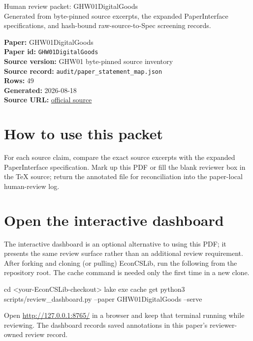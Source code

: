 \documentclass[10pt]{article}
\begin{document}
\fontsize{9}{10}\selectfont

\begin{center}
{\LARGE Human review packet: GHW01DigitalGoods}\\[0.35em]
\small Generated from byte-pinned source excerpts, the expanded PaperInterface
specifications, and hash-bound raw-source-to-Spec screening records.
\end{center}

\noindent\textbf{Paper:} GHW01DigitalGoods\\
\textbf{Paper id:} \texttt{GHW01DigitalGoods}\\
\textbf{Source version:} GHW01 byte-pinned source inventory\\
\textbf{Source record:} \texttt{audit/paper\_statement\_map.json}\\
\textbf{Rows:} 49\\
\textbf{Generated:} 2026-08-18\\
\textbf{Source URL:} \href{http://www.eecs.northwestern.edu/~hartline/papers/auctions-SODA-01.pdf}{official source}

\noindent{}\par



\section*{How to use this packet}
For each source claim, compare the exact source excerpts with the expanded
PaperInterface specification. Mark up this PDF or fill the blank reviewer box in the TeX source;
return the annotated file for reconciliation into the paper-local human-review
log.

\section*{Open the interactive dashboard}
The interactive dashboard is an optional alternative to using this PDF; it
presents the same review surface rather than an additional review requirement.
After forking and cloning (or pulling) EconCSLib, run the following from the
repository root. The cache command is needed only the first time in a new clone.
\begin{ReviewVerbatim}
cd <your-EconCSLib-checkout>
lake exe cache get
python3 scripts/review_dashboard.py --paper GHW01DigitalGoods --serve
\end{ReviewVerbatim}
Open \url{http://127.0.0.1:8765/} in a browser and keep that terminal running
while reviewing. The dashboard records saved annotations in this paper's
reviewer-owned review record.
\end{document}
